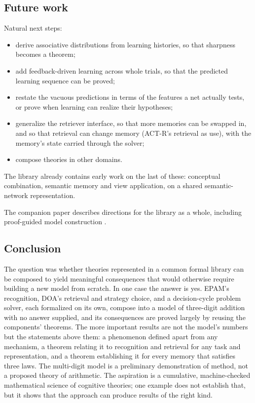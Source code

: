 \documentclass[11pt]{article}
\begin{document}
\subsection{Future work}

Natural next steps:
\begin{itemize}
  \item derive associative distributions from learning histories, so that sharpness becomes a theorem;
  \item add feedback-driven learning across whole trials, so that the predicted learning sequence can be proved;
  \item restate the vacuous predictions in terms of the features a net actually tests, or prove when learning can realize their hypotheses;
  \item generalize the retriever interface, so that more memories can be swapped in, and so that retrieval can change memory (ACT-R's retrieval as use), with the memory's state carried through the solver;
  \item compose theories in other domains.
\end{itemize}
The library already contains early work on the last of these: conceptual combination, semantic memory and view application, on a shared semantic-network representation.

The companion paper describes directions for the library as a whole, including proof-guided model construction \citep{shrager2026coglean}.

\subsection{Conclusion}

The question was whether theories represented in a common formal library can be composed to yield meaningful consequences that would otherwise require building a new model from scratch. In one case the answer is yes. EPAM's recognition, DOA's retrieval and strategy choice, and a decision-cycle problem solver, each formalized on its own, compose into a model of three-digit addition with no answer supplied, and its consequences are proved largely by reusing the components' theorems. The more important results are not the model's numbers but the statements above them: a phenomenon defined apart from any mechanism, a theorem relating it to recognition and retrieval for any task and representation, and a theorem establishing it for every memory that satisfies three laws. The multi-digit model is a preliminary demonstration of method, not a proposed theory of arithmetic. The aspiration is a cumulative, machine-checked mathematical science of cognitive theories; one example does not establish that, but it shows that the approach can produce results of the right kind.
\end{document}
